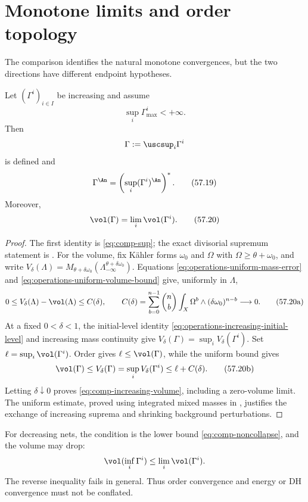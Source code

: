 \section{Monotone limits and order topology}
\label{sec:comp-monotone}

The comparison identifies the natural monotone convergences, but the two
directions have different endpoint hypotheses.

\begin{proposition}\label{prop:comp-increasing-nets}
Let $(\Gamma^i)_{i\in I}$ be increasing and assume
\[
                         \sup_i\Gamma^i_{\max}<+\infty.
\]
Then
\[
 \Gamma:=\uscsup_i\Gamma^i
\]
is defined and
\[
 \Gamma^{\An}
       =\left(\sup_i(\Gamma^i)^{\An}\right)^*.
\tag{57.19}\label{eq:comp-increasing}
\]
Moreover,
\[
                         \vol(\Gamma)=\lim_i\vol(\Gamma^i).
\tag{57.20}\label{eq:comp-increasing-volume}
\]
\end{proposition}

\begin{proof}
The first identity is \eqref{eq:comp-sup}; the exact divisorial
supremum statement is \cite[Theorem~4.13]{XiaOperationsV3}.
For the volume, fix K\"ahler forms $\omega_0$ and $\Omega$ with
$\Omega\geq\theta+\omega_0$, and write
$V_\delta(\Lambda)=M_{\theta+\delta\omega_0}
(\Lambda_{-\infty}^{\theta+\delta\omega_0})$.
Equations \eqref{eq:operations-uniform-mass-error} and
\eqref{eq:operations-uniform-volume-bound} give, uniformly in $\Lambda$,
\[
 0\leq V_\delta(\Lambda)-\vol(\Lambda)\leq C(\delta),
 \qquad
 C(\delta)=\sum_{b=0}^{n-1}\binom nb
       \int_X\Omega^b\wedge(\delta\omega_0)^{n-b}\longrightarrow0.
\tag{57.20a}\label{eq:comp-uniform-volume-error}
\]
At a fixed $0<\delta<1$, the initial-level identity
\eqref{eq:operations-increasing-initial-level} and increasing mass
continuity give $V_\delta(\Gamma)=\sup_iV_\delta(\Gamma^i)$.
Set $\ell=\sup_i\vol(\Gamma^i)$. Order gives
$\ell\leq\vol(\Gamma)$, while the uniform bound gives
\[
 \vol(\Gamma)\leq V_\delta(\Gamma)
 =\sup_iV_\delta(\Gamma^i)\leq\ell+C(\delta).
\tag{57.20b}\label{eq:comp-volume-squeeze}
\]
Letting $\delta\downarrow0$ proves
\eqref{eq:comp-increasing-volume}, including a zero-volume limit.
The uniform estimate, proved using integrated mixed masses in
, justifies the exchange of increasing
suprema and shrinking background perturbations.
\end{proof}

\begin{remark}
\label{rem:comp-decreasing-volume}
For decreasing nets, the condition is the lower bound
\eqref{eq:comp-noncollapse}, and the volume may drop:
\[
                  \vol(\inf_i\Gamma^i)\leq\lim_i\vol(\Gamma^i).
\]
The reverse inequality fails in general.
Thus order convergence and energy or DH convergence must not be conflated.
\end{remark}

